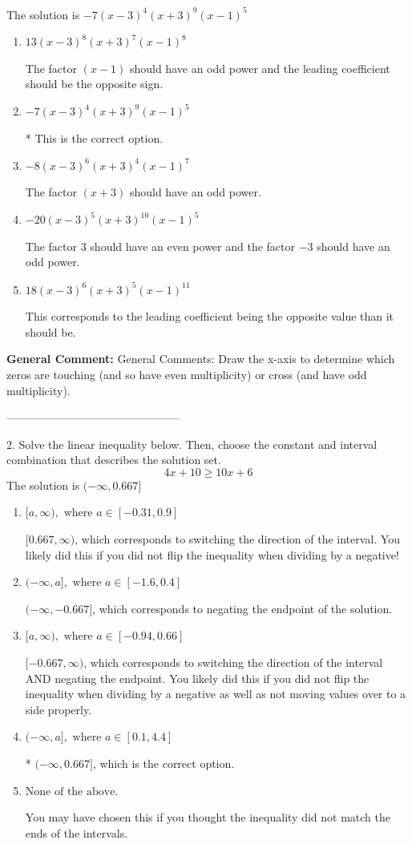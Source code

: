\documentclass{extbook}[14pt]
\begin{document}
The solution is $ -7(x - 3)^{4} (x + 3)^{9} (x - 1)^{5} $ 

\begin{enumerate}[label=\Alph*.] 
\item $ 13(x - 3)^{8} (x + 3)^{7} (x - 1)^{8} $ 

 The factor $(x - 1)$ should have an odd power and the leading coefficient should be the opposite sign. 
\item $ -7(x - 3)^{4} (x + 3)^{9} (x - 1)^{5} $ 

 * This is the correct option. 
\item $ -8(x - 3)^{6} (x + 3)^{4} (x - 1)^{7} $ 

 The factor $(x + 3)$ should have an odd power. 
\item $ -20(x - 3)^{5} (x + 3)^{10} (x - 1)^{5} $ 

 The factor $3$ should have an even power and the factor $-3$ should have an odd power. 
\item $ 18(x - 3)^{6} (x + 3)^{5} (x - 1)^{11} $ 

 This corresponds to the leading coefficient being the opposite value than it should be. 
\end{enumerate} 
 
\textbf{General Comment:} General Comments: Draw the x-axis to determine which zeros are touching (and so have even multiplicity) or cross (and have odd multiplicity). 

-----------------------------------------------

2. Solve the linear inequality below. Then, choose the constant and interval combination that describes the solution set.
\[ 4x + 10 \geq 10x + 6 \] 
The solution is $ (-\infty, 0.667] $ 

\begin{enumerate}[label=\Alph*.] 
\item $ [a, \infty), \text{ where } a \in [-0.31, 0.9] $ 

  $[0.667, \infty)$, which corresponds to switching the direction of the interval. You likely did this if you did not flip the inequality when dividing by a negative! 
\item $ (-\infty, a], \text{ where } a \in [-1.6, 0.4] $ 

  $(-\infty, -0.667]$, which corresponds to negating the endpoint of the solution. 
\item $ [a, \infty), \text{ where } a \in [-0.94, 0.66] $ 

  $[-0.667, \infty)$, which corresponds to switching the direction of the interval AND negating the endpoint. You likely did this if you did not flip the inequality when dividing by a negative as well as not moving values over to a side properly. 
\item $ (-\infty, a], \text{ where } a \in [0.1, 4.4] $ 

 * $(-\infty, 0.667]$, which is the correct option. 
\item $ \text{None of the above}. $ 

 You may have chosen this if you thought the inequality did not match the ends of the intervals. 
\end{enumerate} 
 
\end{document}
